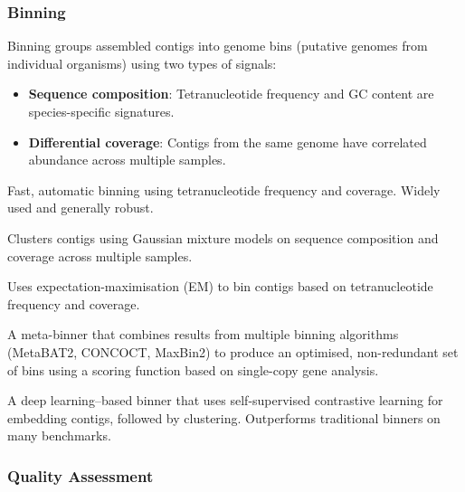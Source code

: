 \subsubsection{Binning}

Binning groups assembled contigs into genome bins (putative genomes from individual organisms) using two types of signals:

\begin{itemize}[nosep]
  \item \textbf{Sequence composition}: Tetranucleotide frequency and GC content are species-specific signatures.
  \item \textbf{Differential coverage}: Contigs from the same genome have correlated abundance across multiple samples.
\end{itemize}

\begin{description}[style=nextline]
  \item[MetaBAT2] Fast, automatic binning using tetranucleotide frequency and coverage. Widely used and generally robust.
  \item[CONCOCT] Clusters contigs using Gaussian mixture models on sequence composition and coverage across multiple samples.
  \item[MaxBin2] Uses expectation-maximisation (EM) to bin contigs based on tetranucleotide frequency and coverage.
  \item[DASTool / DAS Tool] A meta-binner that combines results from multiple binning algorithms (MetaBAT2, CONCOCT, MaxBin2) to produce an optimised, non-redundant set of bins using a scoring function based on single-copy gene analysis.
  \item[SemiBin2] A deep learning--based binner that uses self-supervised contrastive learning for embedding contigs, followed by clustering. Outperforms traditional binners on many benchmarks.
\end{description}

\subsubsection{Quality Assessment}

